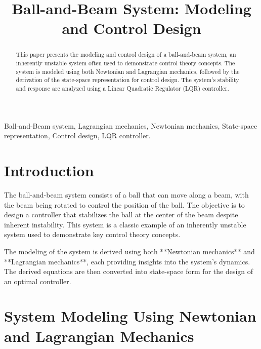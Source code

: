 \documentclass[conference]{IEEEtran}
\begin{document}
\title{Ball-and-Beam System: Modeling and Control Design}

\author{
}

\maketitle

\begin{abstract}
This paper presents the modeling and control design of a ball-and-beam system, an inherently unstable system often used to demonstrate control theory concepts. The system is modeled using both Newtonian and Lagrangian mechanics, followed by the derivation of the state-space representation for control design. The system's stability and response are analyzed using a Linear Quadratic Regulator (LQR) controller.
\end{abstract}

\begin{IEEEkeywords}
Ball-and-Beam system, Lagrangian mechanics, Newtonian mechanics, State-space representation, Control design, LQR controller.
\end{IEEEkeywords}

\section{Introduction}
The ball-and-beam system consists of a ball that can move along a beam, with the beam being rotated to control the position of the ball. The objective is to design a controller that stabilizes the ball at the center of the beam despite inherent instability. This system is a classic example of an inherently unstable system used to demonstrate key control theory concepts.

The modeling of the system is derived using both **Newtonian mechanics** and **Lagrangian mechanics**, each providing insights into the system's dynamics. The derived equations are then converted into state-space form for the design of an optimal controller.

\section{System Modeling Using Newtonian and Lagrangian Mechanics}
\end{document}
